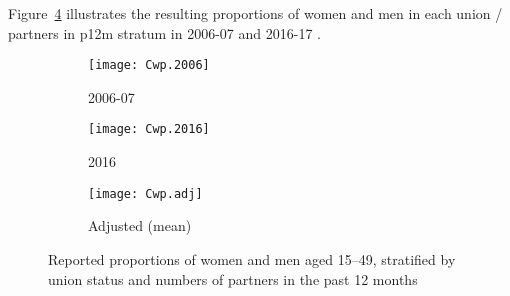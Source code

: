 Figure~\ref{fig:Cwp} illustrates the resulting
proportions of women and men in each union / partners in p12m stratum
in 2006-07  and 2016-17 .
\begin{figure}
  \centering
  \begin{subfigure}{0.7\linewidth}
    \centering
    \texttt{[image: Cwp.2006]}
    \caption{2006-07 \cite{SDHS2006}}
    \label{fig:Cwp.2006}
  \end{subfigure}
  \begin{subfigure}{0.7\linewidth}
    \centering
    \texttt{[image: Cwp.2016]}
    \caption{2016 \cite{SHIMS2}}
    \label{fig:Cwp.2016}
  \end{subfigure}
  \begin{subfigure}{0.7\linewidth}
    \centering
    \texttt{[image: Cwp.adj]}
    \caption{Adjusted (mean)}
    \label{fig:Cwp.adj}
  \end{subfigure}
  \caption{Reported proportions of women and men aged 15--49,
    stratified by union status and numbers of partners in the past 12 months}
  \label{fig:Cwp}
\end{figure}
